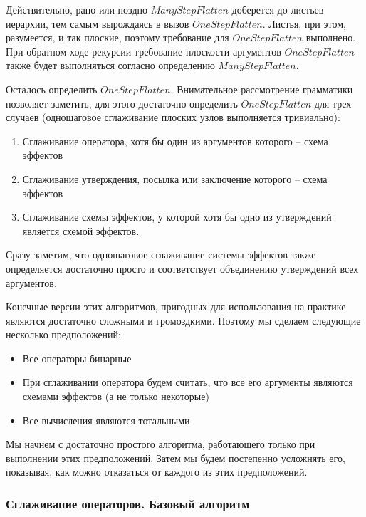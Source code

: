 Действительно, рано или поздно $ManyStepFlatten$ доберется до листьев иерархии, тем самым вырождаясь в вызов $OneStepFlatten$. Листья, при этом, разумеется, и так плоские, поэтому требование для $OneStepFlatten$ выполнено. При обратном ходе рекурсии требование плоскости аргументов $OneStepFlatten$ также будет выполняться согласно определению $ManyStepFlatten$. 

Осталось определить $OneStepFlatten$. Внимательное рассмотрение грамматики позволяет заметить, для этого достаточно определить $OneStepFlatten$ для трех случаев (одношаговое сглаживание плоских узлов выполняется тривиально):

\begin{enumerate}   
    \item Сглаживание оператора, хотя бы один из аргументов которого -- схема эффектов
    
    \item Сглаживание утверждения, посылка или заключение которого -- схема эффектов
    
    \item Сглаживание схемы эффектов, у которой хотя бы одно из утверждений является схемой эффектов.
\end{enumerate}

Сразу заметим, что одношаговое сглаживание системы эффектов также определяется достаточно просто и соответствует объединению утверждений всех аргументов. 

Конечные версии этих алгоритмов, пригодных для использования на практике являются достаточно сложными и громоздкими. Поэтому мы сделаем следующие несколько предположений:

\begin{itemize}
    \item Все операторы бинарные
    
    \item При сглаживании оператора будем считать, что все его аргументы являются схемами эффектов (а не только некоторые)
    
    \item Все вычисления являются тотальными
\end{itemize}

Мы начнем с достаточно простого алгоритма, работающего только при выполнении этих предположений. Затем мы будем постепенно усложнять его, показывая, как можно отказаться от каждого из этих предположений.




\subsubsection{Сглаживание операторов. Базовый алгоритм}

